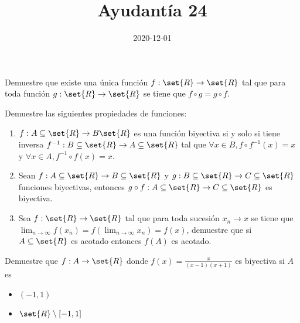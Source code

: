 \documentclass{ayudantia}
\title{Ayudantía 24}
\date{2020-12-01}
\begin{document}
\maketitle

\begin{prob}
    Demuestre que existe una única función \(f:\set{R}\rightarrow\set{R}\) tal que para toda función \(g:\set{R}\rightarrow\set{R}\) se tiene que \(f\circ g=g\circ f\).
\end{prob}

\begin{ans}
    \begin{sol}

    \end{sol}
\end{ans}



\begin{prob}
    Demuestre las siguientes propiedades de funciones:
    \begin{enumerate}
        \item \(f:A\subseteq\set{R}\rightarrow B\set{R}\) es una función biyectiva si y solo si tiene inversa \(f^{-1}:B\subseteq\set{R}\rightarrow A\subseteq\set{R}\) tal que \(\forall x\in B,f\circ f^{-1}(x)=x\) y \(\forall x\in A,f^{-1}\circ f(x)=x\).
        \item Sean \(f:A\subseteq\set{R}\rightarrow B\subseteq\set{R}\) y \(g:B\subseteq\set{R}\rightarrow C\subseteq\set{R}\) funciones biyectivas, entonces \(g\circ f:A\subseteq\set{R}\rightarrow C\subseteq\set{R}\) es biyectiva.
        \item Sea \(f:\set{R}\rightarrow\set{R}\) tal que para toda sucesión \(x_n\rightarrow x\) se tiene que \(\lim_{n\rightarrow\infty}f(x_n)=f(\lim_{n\rightarrow\infty}x_n)=f(x)\), demuestre que si \(A\subseteq\set{R}\) es acotado entonces \(f(A)\) es acotado.
    \end{enumerate}
\end{prob}

\begin{ans}
    \begin{sol}

    \end{sol}
\end{ans}



\begin{prob}
    Demuestre que \(f:A\rightarrow\set{R}\) donde \(f(x)=\frac{x}{(x-1)(x+1)}\) es biyectiva si \(A\) es
    \begin{itemize}
        \item \((-1,1)\)
        \item \(\set{R}\setminus[-1,1]\)
    \end{itemize}
\end{prob}

\begin{ans}
    \begin{sol}

    \end{sol}
\end{ans}
\end{document}
